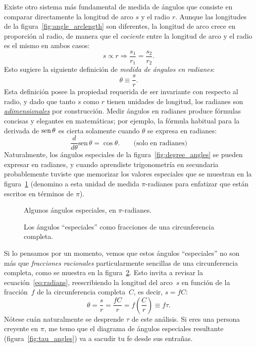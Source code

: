 Existe otro sistema más fundamental de medida de ángulos que consiste en comparar directamente la longitud de arco $s$ y el radio $r$. Aunque las longitudes de la figura~\ref{fig:angle_arclength} son diferentes, la longitud de arco crece en proporción al radio, de manera que el \emph{cociente} entre la longitud de arco y el radio es el mismo en ambos casos:
\[
s\propto r \Rightarrow \frac{s_1}{r_1} = \frac{s_2}{r_2}.
\]
Esto sugiere la siguiente definición de  \emph{medida de ángulos en radianes}:
\begin{equation}
\label{eq:radians}
\theta \equiv \frac{s}{r}.
\end{equation}
Esta definición posee la propiedad requerida de ser invariante con respecto al radio, y dado que tanto $s$ como $r$ tienen unidades de longitud, los radianes son \href{https://es.wikipedia.org/wiki/Magnitud_adimensional}{\emph{adimensionales}} por construcción. Medir ángulos en radianes produce fórmulas concisas y elegantes en matemáticas; por ejemplo, la fórmula habitual para la derivada de  $\mbox{sen}\,\theta$ es cierta solamente cuando $\theta$ se expresa en radianes:
\[
  \frac{d}{d\theta}\mbox{sen}\,\theta = \cos\theta. \qquad\mbox{(solo en radianes)}
\]
Naturalmente, los ángulos especiales de la figura~\ref{fig:degree_angles} se pueden expresar en radianes, y cuando aprendiste trigonometría en secundaria probablemente tuviste que memorizar los valores especiales que se muestran en la figura~\ref{fig:pi_angles} (denomino a esta unidad de medida $\pi$-radianes para enfatizar que están escritos en términos de $\pi$).

\begin{figure}
\begin{center}
\end{center}
\caption{Algunos ángulos especiales, en $\pi$-radianes.\label{fig:pi_angles}}
\end{figure}

\begin{figure}
\begin{center}
\end{center}
\caption{Los ángulos ``especiales'' como fracciones de una circunferencia completa.\label{fig:angle_fractions}}
\end{figure}

Si lo pensamos por un momento, vemos que estos ángulos ``especiales'' no son más que \emph{fracciones racionales} particularmente sencillas de una circunferencia completa, como se muestra en la figura~\ref{fig:angle_fractions}. Esto invita a revisar la ecuación~\eqref{eq:radians}, reescribiendo la longitud del arco~$s$ en función de la fracción~$f$ de la circunferencia completa~$C$, es decir, $s = f C$:
\begin{equation}
\label{eq:circle_fraction}
\theta = \frac{s}{r} = \frac{fC}{r} =  f\left(\frac{C}{r}\right) \equiv f\tau.
\end{equation}
Nótese cuán naturalmente se desprende $\tau$ de este análisis. Si eres una persona creyente en $\pi$, me temo que el diagrama  de ángulos especiales resultante (figura~\ref{fig:tau_angles}) va a sacudir tu fe desde sus entrañas.

